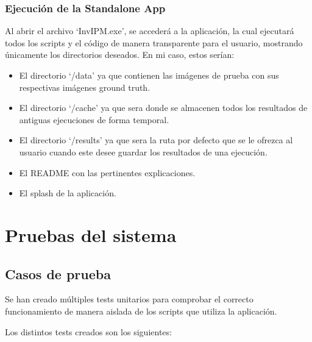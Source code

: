 \subsubsection{Ejecución de la Standalone App}\label{ejecución-de-la-standalone-app}

Al abrir el archivo `InvIPM.exe', se accederá a la aplicación, la cual ejecutará todos los scripts y el código de manera transparente para el usuario, mostrando únicamente los directorios deseados. En mi caso, estos serían:

\begin{itemize}
    \item El directorio `/data' ya que contienen las imágenes de prueba con sus respectivas imágenes ground truth.
    \item El directorio `/cache' ya que sera donde se almacenen todos los resultados de antiguas ejecuciones de forma temporal.
    \item El directorio `/results' ya que sera la ruta por defecto que se le ofrezca al usuario cuando este desee guardar los resultados de una ejecución.
    \item El README con las pertinentes explicaciones.
    \item El splash de la aplicación.
\end{itemize}

\section{Pruebas del sistema}\label{pruebas-del-sistema}

\subsection{Casos de prueba}\label{casos-de-prueba}

Se han creado múltiples tests unitarios para comprobar el correcto funcionamiento de manera aislada de los scripts que utiliza la aplicación.

Los distintos tests creados son los siguientes:

